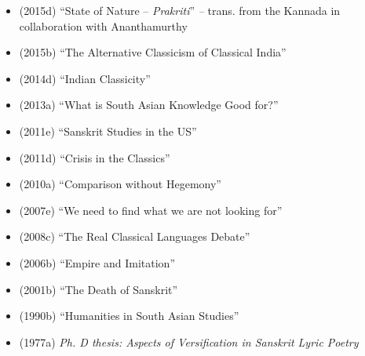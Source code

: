 \begin{itemize}
\item (2015d) “State of Nature – \textit{Prakriti}”\textit{ –} trans. from the Kannada in collaboration with Ananthamurthy

 \item (2015b) “The Alternative Classicism of Classical India”

 \item (2014d) “Indian Classicity”

 \item (2013a) “What is South Asian Knowledge Good for?”

 \item (2011e) “Sanskrit Studies in the US”

 \item (2011d) “Crisis in the Classics”

 \item (2010a) “Comparison without Hegemony”

 \item (2007e) “We need to find what we are not looking for”

 \item (2008c) “The Real Classical Languages Debate”

 \item (2006b) “Empire and Imitation”

 \item (2001b) “The Death of Sanskrit”

 \item (1990b) “Humanities in South Asian Studies”

 \item (1977a) \textit{Ph. D thesis: Aspects of Versification in Sanskrit Lyric Poetry}

\end{itemize}


